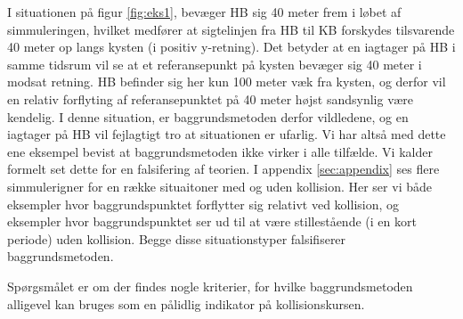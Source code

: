 \documentclass[%
 reprint,
nofootinbib,
aps,
]{revtex4-1}
\begin{document}
I situationen på figur \ref{fig:eks1}, bevæger HB sig 40 meter frem i løbet af simmuleringen, hvilket medfører at sigtelinjen fra HB til KB forskydes tilsvarende 40 meter op langs kysten (i positiv y-retning). Det betyder at en iagtager på HB i samme tidsrum vil se at et referansepunkt på kysten bevæger sig 40 meter i modsat retning. HB befinder sig her kun 100 meter væk fra kysten, og derfor vil en relativ forflyting af referansepunktet på 40 meter højst sandsynlig være kendelig. I denne situation, er baggrundsmetoden derfor vildledene, og en iagtager på HB vil fejlagtigt tro at situationen er ufarlig. Vi har altså med dette ene eksempel bevist at baggrundsmetoden ikke virker i alle tilfælde. Vi kalder formelt set dette for en falsifering af teorien. I appendix \ref{sec:appendix} ses flere simmulerigner for en række situaitoner med og uden kollision. Her ser vi både eksempler hvor baggrundspunktet forflytter sig relativt ved kollision, og eksempler hvor baggrundspunktet ser ud til at være stillestående (i en kort periode) uden kollision. Begge disse situationstyper falsifiserer baggrundsmetoden. \par
Spørgsmålet er om der findes nogle kriterier, for hvilke baggrundsmetoden alligevel kan bruges som en pålidlig indikator på kollisionskursen.
\end{document}

